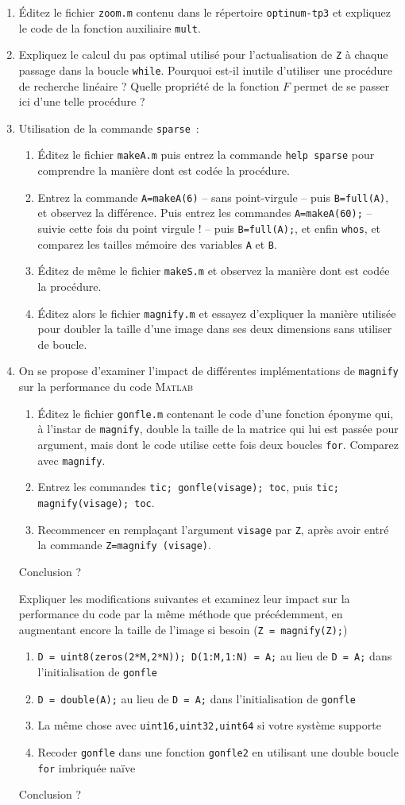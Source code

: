 \documentclass[10pt,a4paper,fleqn]{report}
\newcommand{\matlab}{\textsc{Matlab}}
\newcommand{\onit}{\begin{enumerate}}
\newcommand{\offit}{\end{enumerate}}
\renewcommand{\tt}{\texttt}
\begin{document}
\onit
\item \'Editez le fichier \tt{zoom.m} contenu dans le répertoire \tt{optinum-tp3} et expliquez le code de la fonction auxiliaire \tt{mult}.
\item Expliquez le calcul du pas optimal utilisé pour l'actualisation de \tt Z à chaque passage dans la boucle \tt{while}. Pourquoi est-il inutile d'utiliser une procédure de recherche linéaire ? Quelle propriété de la fonction $F$ permet de se passer ici d'une telle procédure ?
\item Utilisation de la commande \tt{sparse}~:
\onit
\item \'Editez le fichier \tt{makeA.m} puis entrez la commande \tt{help sparse} pour comprendre la manière dont est codée la procédure.
\item Entrez la commande \tt{A=makeA(6)} -- sans point-virgule -- puis \tt{B=full(A)}, et observez la différence. Puis entrez les commandes \tt{A=makeA(60);} -- suivie cette fois du point virgule ! -- puis \tt{B=full(A);}, et enfin \tt{whos}, et comparez les tailles mémoire des variables \tt A et \tt B.
\item \'Editez de même le fichier \tt{makeS.m} et observez la manière dont est codée la procédure.
\item \'Editez alors le fichier \tt{magnify.m} et essayez d'expliquer la manière utilisée pour doubler la taille d'une image dans ses deux dimensions sans utiliser de boucle.
\offit
\item On se propose d'examiner l'impact de différentes implémentations
  de \tt{magnify} sur la performance du code \matlab
\onit
\item \'Editez le fichier \tt{gonfle.m} contenant le code d'une fonction éponyme qui, à l'instar de \tt{magnify}, double la taille de la matrice qui lui est passée pour argument, mais dont le code utilise cette fois deux boucles \tt{for}. Comparez avec \tt{magnify}.
\item Entrez les commandes \tt{tic; gonfle(visage); toc}, puis \tt{tic; magnify(visage); toc}.
\item Recommencer en remplaçant l'argument \tt{visage} par \tt{Z}, après avoir entré la commande \tt{Z=magnify (visage)}.
\offit
Conclusion ?

Expliquer les modifications suivantes et examinez leur impact sur la
performance du code par la même méthode que précédemment, en
augmentant encore la taille de l'image si besoin (\tt{Z = magnify(Z);})
\onit
\item \tt{D = uint8(zeros(2*M,2*N)); D(1:M,1:N) = A;} au lieu de \tt{D = A;} dans l'initialisation
  de \tt{gonfle}
\item \tt{D = double(A);} au lieu de \tt{D = A;} dans l'initialisation
  de \tt{gonfle}
\item La même chose avec \tt{uint16,uint32,uint64} si votre système supporte
\item Recoder \tt{gonfle} dans une fonction \tt{gonfle2} en utilisant une double
  boucle \tt{for} imbriquée naïve
  \offit

  Conclusion ?
\offit
\end{document}
